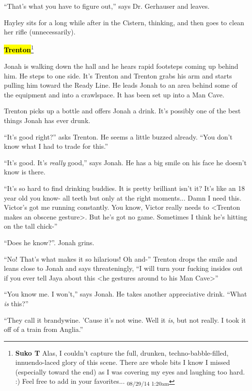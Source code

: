 ``That's what you have to figure out,'' says Dr. Gerhauser and leaves.

Hayley sits for a long while after in the Cistern, thinking, and then goes to clean her rifle (unnecessarily).




\textbf{\hl{Trenton}}\footnote{\textbf{Suko T }Alas, I couldn't capture the full, drunken, techno-babble-filled, innuendo-laced glory of this scene. There are whole bits I know I missed (especially toward the end) as I was covering my eyes and laughing too hard. :)  Feel free to add in your favorites... \textsubscript{08/29/14 1:20am}}

Jonah is walking down the hall and he hears rapid footsteps coming up behind him.  He steps to one side.  It's Trenton and Trenton grabs his arm and starts pulling him toward the Ready Line.  He leads Jonah to an area behind some of the equipment and into a crawlspace.  It has been set up into a Man Cave.



Trenton picks up a bottle and offers Jonah a drink.  It's possibly one of the best things Jonah has ever drunk.

``It's good right?'' asks Trenton.  He seems a little buzzed already.  ``You don't know what I had to trade for this.''

``It's good.  It's \textit{really} good,'' says Jonah.  He has a big smile on his face he doesn't know is there.

``It's so hard to find drinking buddies.  It is pretty brilliant isn't it?  It's like an 18 year old you know- all teeth but only at the right moments...  Damn I need this.  Victor's got me running constantly.  You know, Victor really needs to \textless Trenton makes an obscene gesture\textgreater .  But he's got no game.  Sometimes I think he's hitting on the tall chick-''

``Does he know?''.  Jonah grins.

``No!  That's what makes it so hilarious!  Oh and-'' Trenton drops the smile and leans close to Jonah and says threateningly, ``I will turn your fucking insides out if you ever tell Jaya about this \textless he gestures around to his Man Cave\textgreater ''

``You know me.  I won't,'' says Jonah.  He takes another appreciative drink.  ``What \textit{is} this?''

``They call it brandywine.  'Cause it's not wine.  Well it \textit{is}, but not really.  I took it off of a train from Anglia.''

